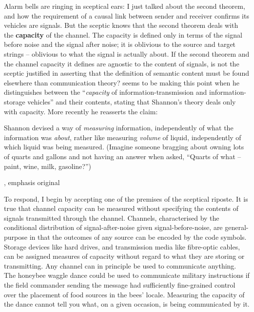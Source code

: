 \documentclass[12pt]{article}
\begin{document}
Alarm bells are ringing in sceptical ears: I just talked about the second theorem, and how the requirement of a causal link between sender and receiver confirms its vehicles are signals.
But the sceptic knows that the second theorem deals with the \textbf{capacity} of the channel.
The capacity is defined only in terms of the signal before noise and the signal after noise; it is oblivious to the source and target strings -- oblivious to what the signal is actually about.
If the second theorem and the channel capacity it defines are agnostic to the content of signals, is not the sceptic justified in asserting that the definition of semantic content must be found elsewhere than communication theory?
\citet[344]{dennett1983intentional} seems to be making this point when he distinguishes between the ``\textit{capacity} of information-transmission and information-storage vehicles'' and their contents, stating that Shannon's theory deals only with capacity.
More recently he reasserts the claim:

\begin{myquote}
Shannon devised a way of \textit{measuring} information, independently of what the information was \textit{about}, rather like measuring \textit{volume} of liquid, independently of which liquid was being measured. (Imagine someone bragging about owning lots of quarts and gallons and not having an answer when asked, ``Quarts of what -- paint, wine, milk, gasoline?'')
\par\hspace*{\fill}\citet[106]{dennett2017bacteria}, emphasis original
\end{myquote}

\noindent To respond, I begin by accepting one of the premises of the sceptical riposte.
It is true that channel capacity can be measured without specifying the contents of signals transmitted through the channel.
Channels, characterised by the conditional distribution of signal-after-noise given signal-before-noise, are general-purpose in that the outcomes of any source can be encoded by the code symbols.
Storage devices like hard drives, and transmission media like fibre-optic cables, can be assigned measures of capacity without regard to what they are storing or transmitting.
Any channel can in principle be used to communicate anything.
The honeybee waggle dance could be used to communicate military instructions if the field commander sending the message had sufficiently fine-grained control over the placement of food sources in the bees' locale.
Measuring the capacity of the dance cannot tell you what, on a given occasion, is being communicated by it.
\end{document}

